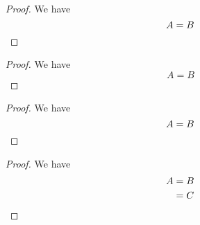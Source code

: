 \documentclass{article}
\begin{document}
\begin{proof}
	We have
	$$ A=B \qedhere $$ %
\end{proof}

\begin{proof}
	We have
	$$ A=B $$ \qedhere
\end{proof}

\begin{proof}
	We have
	\[ A=B \qedhere \]
\end{proof}

\begin{proof}
	We have
	\begin{align*}
		A&=B\\&=C \qedhere
	\end{align*}
\end{proof}
\end{document}
